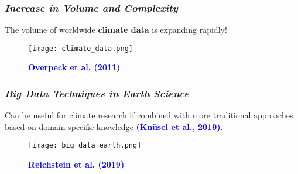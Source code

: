 \documentclass[11pt]{beamer}
\newcommand{\citat}[2]{\textbf{\textcolor{blue}{#1 et al. (#2)}}}
\newcommand{\citap}[2]{\textbf{\textcolor{blue}{(#1 et al., #2)}}}
\begin{document}
\begin{frame}[fragile]
  \frametitle{\normalsize{\textbf{
        \emph{Increase in Volume and Complexity}
  }}} 

  \vspace{0.25cm}
  
  \scriptsize{

    \textbullet \: The volume of worldwide \textbf{climate data} is expanding
    rapidly!
    
  \begin{figure}[h!]
    \centering
    \texttt{[image: climate\_data.png]}
    \caption*{\scriptsize{
        \citat{Overpeck}{2011}
      }}
  \end{figure}
    
  }
\end{frame}

\begin{frame}[fragile]
  \frametitle{\normalsize{\textbf{
        \emph{Big Data Techniques in Earth Science}
  }}} 

  \vspace{0.25cm}
  
  \scriptsize{

    \textbullet \: Can be useful for climate research if combined with more
    traditional approaches based on domain-specific knowledge \citap{Knüsel}{2019}.
    
    \begin{figure}[h!]
      \centering
      \texttt{[image: big\_data\_earth.png]}
      \caption*{\scriptsize{
          \citat{Reichstein}{2019}
      }}
    \end{figure}
        
  }
  
\end{frame}
\end{document}
